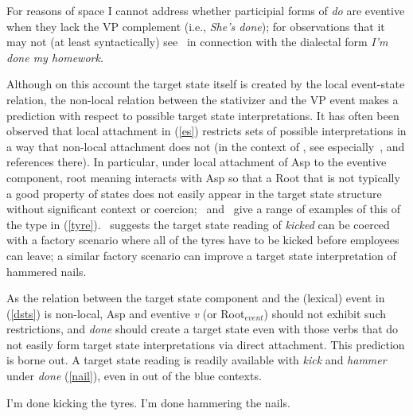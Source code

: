 \documentclass[output=paper]{langsci/langscibook}
\begin{document}
For reasons of space I cannot address whether participial forms of \emph{do}
are eventive when they lack the VP complement (i.e., \emph{She's done}); for
observations that it may not (at least syntactically) see~\cite{Fruehwald2015a}
in connection with the dialectal form \emph{I'm done my homework}.

Although on this account the target state itself is created by the local
event-state relation, the non-local relation between the stativizer and the VP
event makes a prediction with respect to possible target state interpretations.
It has often been observed that  local attachment in (\ref{es}) restricts sets
of possible interpretations in a way that non-local attachment does not (in the
context of , see especially~\cite{Anagnostopoulou2013a}, and
references there). In particular, under local attachment of Asp to the eventive
component, root meaning interacts with Asp so that a Root that is not typically
a good property of states does not easily appear in the target state structure
without significant context or coercion;~\cite{Kratzer2001a}
and~\cite{Embick2009a} give a range of examples of this of the type in
(\ref{tyre}).~\cite{Embick2004a} suggests the target state reading of
\emph{kicked} can be coerced with a factory scenario where all of the tyres
have to be kicked before employees can leave; a similar factory scenario can
improve a target state interpretation of hammered nails.


\begin{exe}
\ex\label{tyre}
\begin{xlist}
\end{xlist}
\end{exe}

As the relation between the target state component and the (lexical) event in
(\ref{dsts}) is non-local, Asp and eventive \emph{v} (or Root$_{event}$) should
not exhibit such restrictions, and \emph{done} should create a target state
even with those verbs that do not easily form target state interpretations via
direct attachment. This prediction is borne out. A target state reading is
readily available with \emph{kick} and \emph{hammer} under \emph{done}
(\ref{nail}), even in out of the blue contexts.

\begin{exe}
\ex\label{nail}
\begin{xlist}
\ex I'm done kicking the tyres.
\ex I'm done hammering the nails.
\end{xlist}
\end{exe}
\end{document}
